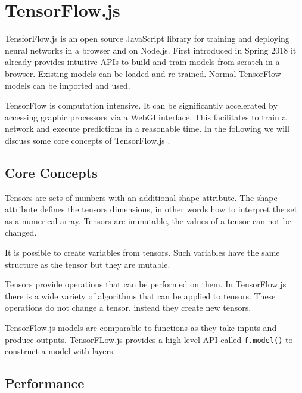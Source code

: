 \section{TensorFlow.js}
TensforFlow.js is an open source JavaScript library for training and deploying
neural networks in a browser and on Node.js. 
First introduced in Spring 2018 it already provides intuitive APIs to build and train models from scratch in a browser.
Existing models can be loaded and re-trained.
Normal TensorFlow models can be imported and used. 

TensorFlow is computation intensive.
It can be significantly accelerated by accessing graphic processors via a WebGl interface.
This facilitates to train a network and execute predictions in a reasonable time. 
In the following we will discuss some core concepts of TensorFlow.js \cite{TenosrFLowJs}. 

\subsection{Core Concepts}

Tensors are sets of numbers with an additional shape attribute.
The shape attribute defines the tensors dimensions, 
in other words how to interpret the set as a numerical array.
Tensors are immutable, the values of a tensor can not be changed.



It is possible to create variables from tensors. Such variables have the same structure as the tensor but they 
are mutable.



Tensors provide operations that can be performed on them. In TensorFlow.js there is a wide variety
of algorithms that can be applied to tensors.
These operations do not change a tensor, instead they create new tensors.



TensorFlow.js models are comparable  to functions as they  take inputs and produce outputs.
TensorFLow.js provides a high-level API called \texttt{f.model()} to construct a model with layers.



\subsection{Performance}

